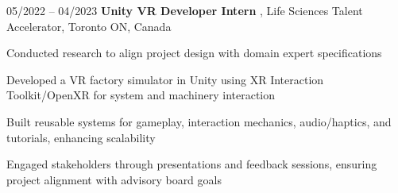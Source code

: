 \begin{twocolentry}{
    05/2022 – 04/2023
}
    \textbf{Unity VR Developer Intern }, Life Sciences Talent Accelerator, Toronto ON, Canada\end{twocolentry}

\vspace{0.10 cm}
\begin{onecolentry}
    \begin{highlights}
        \item Conducted research to align project design with domain expert specifications 
        \item Developed a VR factory simulator in Unity using XR Interaction Toolkit/OpenXR for system and machinery interaction
        \item Built reusable systems for gameplay, interaction mechanics, audio/haptics, and tutorials, enhancing scalability
        \item Engaged stakeholders through presentations and feedback sessions, ensuring project alignment with advisory board goals
    \end{highlights}
\end{onecolentry}